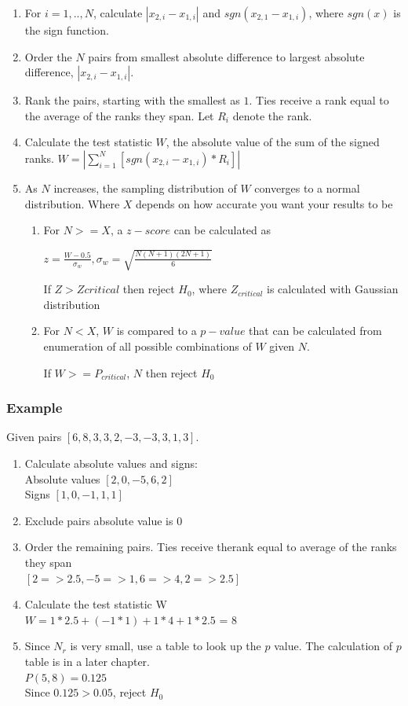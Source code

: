 \documentclass[12pt]{article}
\begin{document}
\begin{enumerate}
\item
For $i=1, .., N$, calculate $|x_{2,i} - x_{1,i}|$ and $sgn(x_{2,1} - x_{1,i})$, where $sgn(x)$ is the sign function.
\item
Order the $N$ pairs from smallest absolute difference to largest absolute difference, $|x_{2,i} - x_{1,i}|$.
\item
Rank the pairs, starting with the smallest as $1$. Ties receive a rank equal to the average of the ranks they span. Let $R_i$ denote the rank.
\item
Calculate the test statistic $W$, the absolute value of the sum of the signed ranks. $W=|\sum\limits_{i=1}^{N} [sgn(x_{2,i} - x_{1,i})*R_i]|$
\item
As $N$ increases, the sampling distribution of $W$ converges to a normal distribution. Where $X$ depends on how accurate you want your results to be
\begin{enumerate}
\item
For $N >= X$, a $z-score$ can be calculated as

$z=\frac{W-0.5}{\sigma_w},\sigma_w = \sqrt{\frac{N(N + 1)(2N + 1)}{6}}$

If $Z > Zcritical$ then reject $H_0$, where $Z_{critical}$ is calculated with Gaussian distribution

\item
For $N < X$, $W$  is compared to a $p-value$ that can be calculated from enumeration of all possible combinations of $W$ given $N$.

If $W >= P_{critical}$, $N$ then reject $H_0$
\end{enumerate}
\end{enumerate}

\subsubsection{Example}
Given pairs $[{6, 8}, {3, 3}, {2, -3}, {-3, 3}, {1, 3}]$.

\begin{enumerate}
\item Calculate absolute values and signs: \\
Absolute values $[2, 0, -5, 6, 2]$ \\
Signs $[1, 0, -1, 1, 1]$
\item Exclude pairs absolute value is $0$
\item Order the remaining pairs. Ties receive therank equal to average of the ranks they span \\
$[{2 => 2.5}, {-5 => 1}, {6 => 4}, {2 => 2.5}]$
\item Calculate the test statistic W \\
$W = 1*2.5 + (-1*1) + 1*4 + 1*2.5$ = 8
\item Since $N_r$ is very small, use a table to look up the $p$ value. The calculation of $p$ table is in a later chapter. \\
$P(5, 8) = 0.125$ \\
Since $0.125 > 0.05$, reject $H_0$
\end{enumerate}
\end{document}
